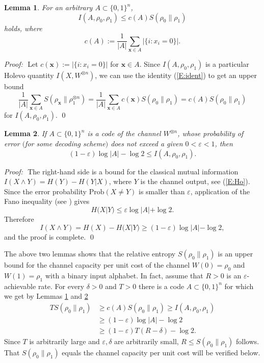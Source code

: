 \documentclass[12pt,a4paper]{article}
\newtheorem{lemma}{Lemma}
\def\Prob{{\mathrm{Prob}}}
\def\eps{\varepsilon}
\def\ot{\otimes}
\def\proof{{\it Proof:}\,\,}
\def\bfx{\mathbf{x}}
\begin{document}
\begin{lemma}\label{L:2}
For an arbitrary $A \subset \{0,1\}^n$,
$$
I(A,\rho_0,\rho_1) \le c(A) S(\rho_0\|\rho_1)
$$
holds, where
$$
c(A):= \frac{1}{|A|}\sum_{\bfx \in A}|\{i: x_i=0\}|.
$$
\end{lemma}

\proof
Let $c(\bfx):=|\{i: x_i=0\}|$ for $\bfx \in A$. Since 
$I(A,\rho_0,\rho_1)$ is a particular Holevo quantity $I(X,  W^{\ot n})$,
we can use the identity (\ref{E:ident}) to get an upper bound
$$
\frac{1}{|A|}\sum_{\bfx \in A} S(\rho_\bfx\|\rho_1^{\ot n})=
\frac{1}{|A|}\sum_{\bfx \in A} c(\bfx)S(\rho_0\|\rho_1)=
c(A)S(\rho_0\|\rho_1)
$$
for $I(A,\rho_0,\rho_1)$. \qed

\begin{lemma}\label{L:4}
 If $A \subset \{0,1\}^n$ is a code of the channel $W^{\ot n}$,
whose probability of error $($for some decoding scheme$)$ does not exceed a given
$0 < \eps <1$, then
$$
(1-\eps) \log |A| - \log 2 \le I(A,\rho_0,\rho_1).  
$$
\end{lemma}
\proof
The right-hand side is   a bound for the classical mutual information
$I(X\wedge Y)=H(Y)-H(Y|X)$, where $Y$ is the channel output, see (\ref{E:Ho}).
Since the error probability $\Prob(X\ne Y)$ is smaller than $\eps$, application
of the Fano inequality (see \cite{CT}) gives
$$
H(X |Y )\le \eps \log |A| +\log 2.
$$
Therefore
$$
I(X \wedge Y )= H(X)-H(X | Y ) \ge (1-\eps)\log |A| - \log2,
$$
and the proof is complete. \qed

 
The above two lemmas shows that the relative entropy $S(\rho_0\|\rho_1)$ is an
upper bound for the channel capacity per unit cost of the channel $W(0)=\rho_0$
and $W(1)=\rho_1$ with a binary input alphabet. In fact, assume that $R>0$ is an
$\eps$-achievable rate. For every $\delta>0$ and $T>0$ there is a code
$A\subset\{0,1\}^n$ for which we get by Lemmas \ref{L:2} and \ref{L:4}
\begin{align*}
TS(\rho_0\|\rho_1)&\ge c(A)S(\rho_0\|\rho_1)\ge I(A,\rho_0,\rho_1) \\
&\ge(1-\eps)\log|A|-\log2 \\
&\ge(1-\eps)T(R-\delta)-\log 2.
\end{align*}
Since $T$ is arbitrarily large and $\eps,\delta$ are arbitrarily small,
$R\le S(\rho_0\|\rho_1)$ follows. That $S(\rho_0\|\rho_1)$ equals the channel
capacity per unit cost will be verified below.
\end{document}
